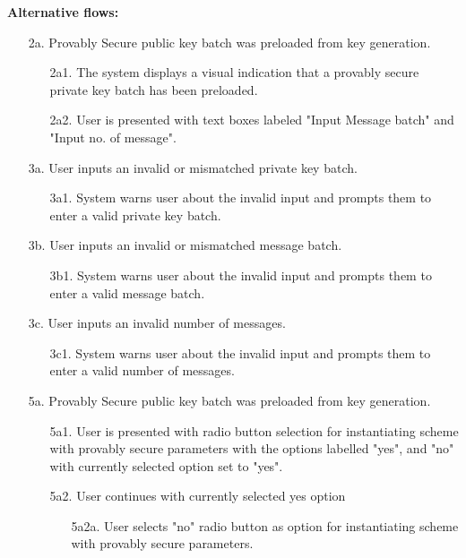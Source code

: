 \documentclass[]{final_report}
\theoremstyle{definition}
\begin{document}
\noindent\textbf{Alternative flows:}
\begin{enumerate}
     \item[2a.] Provably Secure public key batch was preloaded from key generation.
    \begin{enumerate}
     \item[2a1.] The system displays a visual indication that a provably secure private key batch has been preloaded.
    \item[2a2.] User is presented with text boxes labeled "Input Message batch" and "Input no. of message".
    \end{enumerate}
    \item[3a.] User inputs an invalid or mismatched private key batch.
    \begin{enumerate}
        \item[3a1.] System warns user about the invalid input and prompts them to enter a valid private key batch.
    \end{enumerate}
     \item[3b.] User inputs an invalid or mismatched message batch.
    \begin{enumerate}
        \item[3b1.] System warns user about the invalid input and prompts them to enter a valid message batch.
    \end{enumerate}
     \item[3c.] User inputs an invalid number of messages.
    \begin{enumerate}
        \item[3c1.] System warns user about the invalid input and prompts them to enter a valid number of messages.
    \end{enumerate}
         \item[5a.] Provably Secure public key batch was preloaded from key generation.
    \begin{enumerate}
     \item[5a1.] User is presented with radio button selection for instantiating scheme with provably secure parameters with the options labelled "yes", and "no" with currently selected option set to "yes".
    \item[5a2.]  User continues with currently selected yes option
        \begin{enumerate}
      \item[5a2a.] User selects "no" radio button as option for instantiating scheme with provably secure parameters.
    \begin{enumerate}

\end{enumerate}
\end{enumerate}
\end{enumerate}
\end{enumerate}
\end{document}
